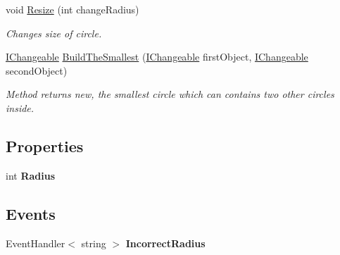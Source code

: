 \begin{DoxyCompactItemize}
void \mbox{\hyperlink{class_home_work_1_1_task_library_1_1_tasks_1_1_lesson6_1_1_task2_1_1_classes_1_1_circle_ab541d3592fabffaa43fc67a88b23c20e}{Resize}} (int change\+Radius)
\begin{DoxyCompactList}\small\item\em Changes size of circle. \end{DoxyCompactList}\item 
\mbox{\hyperlink{interface_home_work_1_1_task_library_1_1_tasks_1_1_lesson6_1_1_task2_1_1_interfaces_1_1_i_changeable}{I\+Changeable}} \mbox{\hyperlink{class_home_work_1_1_task_library_1_1_tasks_1_1_lesson6_1_1_task2_1_1_classes_1_1_circle_ab8d3d404b5c85359896d5789a804faac}{Build\+The\+Smallest}} (\mbox{\hyperlink{interface_home_work_1_1_task_library_1_1_tasks_1_1_lesson6_1_1_task2_1_1_interfaces_1_1_i_changeable}{I\+Changeable}} first\+Object, \mbox{\hyperlink{interface_home_work_1_1_task_library_1_1_tasks_1_1_lesson6_1_1_task2_1_1_interfaces_1_1_i_changeable}{I\+Changeable}} second\+Object)
\begin{DoxyCompactList}\small\item\em Method returns new, the smallest circle which can contains two other circles inside. \end{DoxyCompactList}\end{DoxyCompactItemize}
\subsection*{Properties}
\begin{DoxyCompactItemize}
\item 
\mbox{\label{class_home_work_1_1_task_library_1_1_tasks_1_1_lesson6_1_1_task2_1_1_classes_1_1_circle_af5627eba629d476fe67b5efd648efc0d}} 
int {\bfseries Radius}
\end{DoxyCompactItemize}
\subsection*{Events}
\begin{DoxyCompactItemize}
\item 
\mbox{\label{class_home_work_1_1_task_library_1_1_tasks_1_1_lesson6_1_1_task2_1_1_classes_1_1_circle_af9e614ea504de44e9c602d6465e61e9c}} 
Event\+Handler$<$ string $>$ {\bfseries Incorrect\+Radius}
\end{DoxyCompactItemize}
